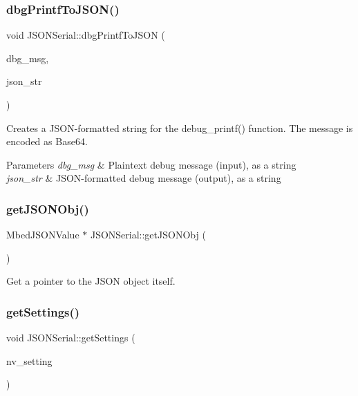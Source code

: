 \subsubsection{\texorpdfstring{dbg\+Printf\+To\+J\+S\+O\+N()}{dbgPrintfToJSON()}}
{\footnotesize\ttfamily void J\+S\+O\+N\+Serial\+::dbg\+Printf\+To\+J\+S\+ON (\begin{DoxyParamCaption}\item[{string \&}]{dbg\+\_\+msg,  }\item[{string \&}]{json\+\_\+str }\end{DoxyParamCaption})}

Creates a J\+S\+O\+N-\/formatted string for the debug\+\_\+printf() function. The message is encoded as Base64. 
\begin{DoxyParams}{Parameters}
{\em dbg\+\_\+msg} & Plaintext debug message (input), as a string \\
\hline
{\em json\+\_\+str} & J\+S\+O\+N-\/formatted debug message (output), as a string \\
\hline
\end{DoxyParams}
\mbox{\label{classJSONSerial_a80f901fa66a7d4e5ed91c01493e5adfe}} 
\subsubsection{\texorpdfstring{get\+J\+S\+O\+N\+Obj()}{getJSONObj()}}
{\footnotesize\ttfamily Mbed\+J\+S\+O\+N\+Value $\ast$ J\+S\+O\+N\+Serial\+::get\+J\+S\+O\+N\+Obj (\begin{DoxyParamCaption}\item[{void}]{ }\end{DoxyParamCaption})}

Get a pointer to the J\+S\+ON object itself. \mbox{\label{classJSONSerial_a7f12c4a3d58ff26825fbaf8694b7a795}} 
\subsubsection{\texorpdfstring{get\+Settings()}{getSettings()}}
{\footnotesize\ttfamily void J\+S\+O\+N\+Serial\+::get\+Settings (\begin{DoxyParamCaption}\item[{Mbed\+J\+S\+O\+N\+Value \&}]{nv\+\_\+setting }\end{DoxyParamCaption})}

